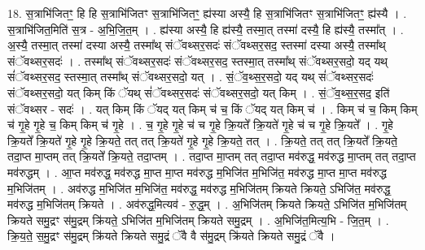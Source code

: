 \documentclass[17pt]{extarticle}
\begin{document}
18. स॒त्राभि॑जितꣳ॒॒ हि हि स॒त्राभि॑जितꣳ स॒त्राभि॑जितꣳ॒॒ ह्य॑स्या अस्यै॒ हि स॒त्राभि॑जितꣳ स॒त्राभि॑जितꣳ॒॒ ह्य॑स्यै । . स॒त्राभि॑जित॒मिति॑ स॒त्र - अ॒भि॒जि॒त॒म् । . ह्य॑स्या अस्यै॒ हि ह्य॑स्यै॒ तस्मा॒त् तस्मा॑ दस्यै॒ हि ह्य॑स्यै॒ तस्मा᳚त् । . अ॒स्यै॒ तस्मा॒त् तस्मा॑ दस्या अस्यै॒ तस्मा᳚थ् संॅवथ्सर॒सदः॑ संॅवथ्सर॒सद॒ स्तस्मा॑ दस्या अस्यै॒ तस्मा᳚थ् संॅवथ्सर॒सदः॑ । . तस्मा᳚थ् संॅवथ्सर॒सदः॑ संॅवथ्सर॒सद॒ स्तस्मा॒त् तस्मा᳚थ् संॅवथ्सर॒सदो॒ यद् यथ् सं॑ॅवथ्सर॒सद॒ स्तस्मा॒त् तस्मा᳚थ् संॅवथ्सर॒सदो॒ यत् । . सं॒ॅव॒थ्स॒र॒सदो॒ यद् यथ् सं॑ॅवथ्सर॒सदः॑ संॅवथ्सर॒सदो॒ यत् किम् किं ॅयथ् सं॑ॅवथ्सर॒सदः॑ संॅवथ्सर॒सदो॒ यत् किम् । . सं॒ॅव॒थ्स॒र॒सद॒ इति॑ संॅवथ्सर - सदः॑ । . यत् किम् किं ॅयद् यत् किम् च॑ च॒ किं ॅयद् यत् किम् च॑ । . किम् च॑ च॒ किम् किम् च॑ गृ॒हे गृ॒हे च॒ किम् किम् च॑ गृ॒हे । . च॒ गृ॒हे गृ॒हे च॑ च गृ॒हे क्रि॒यते᳚ क्रि॒यते॑ गृ॒हे च॑ च गृ॒हे क्रि॒यते᳚ । . गृ॒हे क्रि॒यते᳚ क्रि॒यते॑ गृ॒हे गृ॒हे क्रि॒यते॒ तत् तत् क्रि॒यते॑ गृ॒हे गृ॒हे क्रि॒यते॒ तत् । . क्रि॒यते॒ तत् तत् क्रि॒यते᳚ क्रि॒यते॒ तदा॒प्त मा॒प्तम् तत् क्रि॒यते᳚ क्रि॒यते॒ तदा॒प्तम् । . तदा॒प्त मा॒प्तम् तत् तदा॒प्त मव॑रुद्ध॒ मव॑रुद्ध मा॒प्तम् तत् तदा॒प्त मव॑रुद्धम् । . आ॒प्त मव॑रुद्ध॒ मव॑रुद्ध मा॒प्त मा॒प्त मव॑रुद्ध म॒भिजि॑त म॒भिजि॑त॒ मव॑रुद्ध मा॒प्त मा॒प्त मव॑रुद्ध म॒भिजि॑तम् । . अव॑रुद्ध म॒भिजि॑त म॒भिजि॑त॒ मव॑रुद्ध॒ मव॑रुद्ध म॒भिजि॑तम् क्रियते क्रियते॒ ऽभिजि॑त॒ मव॑रुद्ध॒ मव॑रुद्ध म॒भिजि॑तम् क्रियते । . अव॑रुद्ध॒मित्यव॑ - रु॒द्ध॒म् । . अ॒भिजि॑तम् क्रियते क्रियते॒ ऽभिजि॑त म॒भिजि॑तम् क्रियते समु॒द्रꣳ स॑मु॒द्रम् क्रि॑यते॒ ऽभिजि॑त म॒भिजि॑तम् क्रियते समु॒द्रम् । . अ॒भिजि॑त॒मित्य॒भि - जि॒त॒म् । . क्रि॒य॒ते॒ स॒मु॒द्रꣳ स॑मु॒द्रम् क्रि॑यते क्रियते समु॒द्रं ॅवै वै स॑मु॒द्रम् क्रि॑यते क्रियते समु॒द्रं ॅवै । \newline
\end{document}
